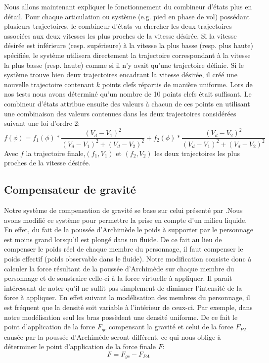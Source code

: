 \documentclass[runningheads,a4paper]{llncs}
\begin{document}
Nous allons maintenant expliquer le fonctionnement du combineur d'états plus en détail. Pour chaque articulation ou système (e.g. pied en phase de vol) possédant plusieurs trajectoires, le combineur d'états va chercher les deux trajectoires associées aux deux vitesses les plus proches de la vitesse désirée. Si la vitesse désirée est inférieure (resp. supérieure) à la vitesse la plus basse (resp. plus haute) spécifiée, le système utilisera directement la trajectoire correspondant à la vitesse la plus basse (resp. haute) comme si il n'y avait qu'une trajectoire définie. Si le système trouve bien deux trajectoires encadrant la vitesse désirée, il créé une nouvelle trajectoire contenant $k$ points clefs répartis de manière uniforme. Lors de nos tests nous avons déterminé qu'un nombre de 10 points clefs était suffisant. Le combineur d'états attribue ensuite des valeurs à chacun de ces points en utilisant une combinaison des valeurs contenues dans les deux trajectoires considérées suivant une loi d'ordre 2:
$$
f(\phi)=f_1(\phi)*\frac{(V_d-V_1)^2}{(V_d-V_1)^2+(V_d-V_2)^2}+f_2(\phi)*\frac{(V_d-V_2)^2}{(V_d-V_1)^2+(V_d-V_2)^2}
$$
Avec $f$ la trajectoire finale,$(f_1,V_1)$ et $(f_2,V_2)$ les deux trajectoires les plus proches de la vitesse désirée.
% 
\subsection{Compensateur de gravité}
Notre système de compensation de gravité se base sur celui présenté par \cite{coros2010generalized}.Nous avons modifié ce système pour permettre la prise en compte d'un milieu liquide. En effet, du fait de la poussée d'Archimède le poids à supporter par le personnage est moins grand lorsqu'il est plongé dans un fluide. De ce fait au lieu de compenser le poids réel de chaque membre du personnage, il faut compenser le poids effectif (poids observable dans le fluide). Notre modification consiste donc à calculer la force résultant de la poussée d'Archimède sur chaque membre du personnage et de soustraire celle-ci à la force virtuelle à appliquer. Il parait intéressant de noter qu'il ne suffit pas simplement de diminuer l'intensité de la force à appliquer. En effet suivant la modélisation des membres du personnage, il est fréquent que la densité soit variable à l'intérieur de ceux-ci. Par exemple, dans notre modélisation seul les bras possèdent une densité uniforme. De ce fait le point d'application de la force  $F_{gc}$ compensant la gravité et celui de la force $F_{PA}$ causée par la poussée d'Archimède seront différent, ce qui nous oblige à déterminer le point d'application de la force finale $F$:
$$
F=F_{gc}- F_{PA}
$$
\end{document}
